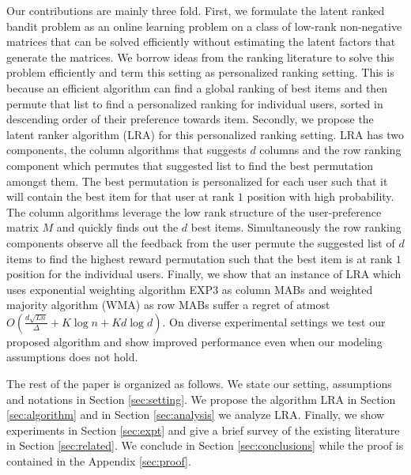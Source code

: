 Our contributions are mainly three fold. First, we formulate the latent ranked bandit problem as an online learning problem on a class of low-rank non-negative matrices that can be solved efficiently without estimating the latent factors that generate the matrices. We borrow ideas from the ranking literature to solve this problem efficiently and term this setting as personalized ranking setting. This is because an efficient algorithm can find a global ranking of best items and then permute that list to find a personalized ranking for individual users, sorted in descending order of their preference towards item. Secondly, we propose the latent ranker algorithm (LRA) for this personalized ranking setting. LRA has two components, the column algorithms that suggests $d$ columns and the row ranking component which permutes that suggested list to find the best permutation amongst them. The best permutation is personalized for each user such that it will contain the best item for that user at rank $1$ position with high probability. The column algorithms leverage the low rank structure of the user-preference matrix $M$ and quickly finds out the $d$ best items. Simultaneously the row ranking components observe all the feedback from the user permute the suggested list of $d$ items to find the highest reward permutation such that the best item is at rank $1$ position for the individual users. Finally, we show that an instance of LRA which uses exponential weighting algorithm EXP3 as column MABs and weighted majority algorithm (WMA) as row MABs suffer a regret of atmost $O\left(\frac{d \sqrt{L n}}{\Delta} + K \log n + K d \log d\right)$. On diverse experimental settings we test our proposed algorithm and show improved performance even when our modeling assumptions does not hold.

	The rest of the paper is organized as follows. We state our setting, assumptions and notations in Section \ref{sec:setting}. We propose the algorithm LRA in Section \ref{sec:algorithm} and in Section \ref{sec:analysis} we analyze LRA. Finally, we show experiments in Section \ref{sec:expt} and give a brief survey of the existing literature in Section \ref{sec:related}. We conclude in Section \ref{sec:conclusions} while the proof is contained in the Appendix \ref{sec:proof}.